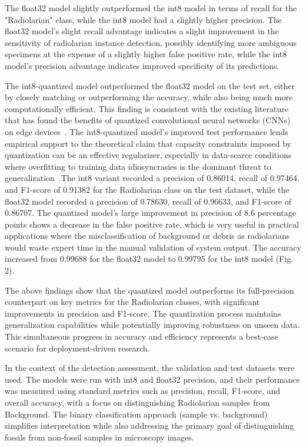 \documentclass[a4paper,fleqn]{cas-sc}
\begin{document}
The float32 model slightly outperformed the int8 model in terms of recall for the "Radiolarian" class, while the int8 model had a slightly higher precision. The float32 model's slight recall advantage indicates a slight improvement in the sensitivity of radiolarian instance detection, possibly identifying more ambiguous specimens at the expense of a slightly higher false positive rate, while the int8 model's precision advantage indicates improved specificity of its predictions.

The int8-quantized model outperformed the float32 model on the test set, either by closely matching or outperforming the accuracy, while also being much more computationally efficient. This finding is consistent with the existing literature that has found the benefits of quantized convolutional neural networks (CNNs) on edge devices~\cite{edgeimpulse2023,yaqoob2024tinyml}. The int8-quantized model's improved test performance lends empirical support to the theoretical claim that capacity constraints imposed by quantization can be an effective regularizer, especially in data-scarce conditions where overfitting to training data idiosyncrasies is the dominant threat to generalization~\cite{yaqoob2024tinyml}.The int8 variant recorded a precision of 0.86014, recall of 0.97464, and F1-score of 0.91382 for the Radiolarian class on the test dataset, while the float32 model recorded a precision of 0.78630, recall of 0.96633, and F1-score of 0.86707. The quantized model's large improvement in precision of 8.6 percentage points shows a decrease in the false positive rate, which is very useful in practical applications where the misclassification of background or debris as radiolarians would waste expert time in the manual validation of system output. The accuracy increased from 0.99688 for the float32 model to 0.99795 for the int8 model (Fig. 2).

The above findings show that the quantized model outperforms its full-precision counterpart on key metrics for the Radiolarian classes, with significant improvements in precision and F1-score. The quantization process maintains generalization capabilities while potentially improving robustness on unseen data. This simultaneous progress in accuracy and efficiency represents a best-case scenario for deployment-driven research.

In the context of the detection assessment, the validation and test datasets were used. The models were run with int8 and float32 precision, and their performance was measured using standard metrics such as precision, recall, F1-score, and overall accuracy, with a focus on distinguishing Radiolarian samples from Background. The binary classification approach (sample vs. background) simplifies interpretation while also addressing the primary goal of distinguishing fossils from non-fossil samples in microscopy images.
\end{document}
